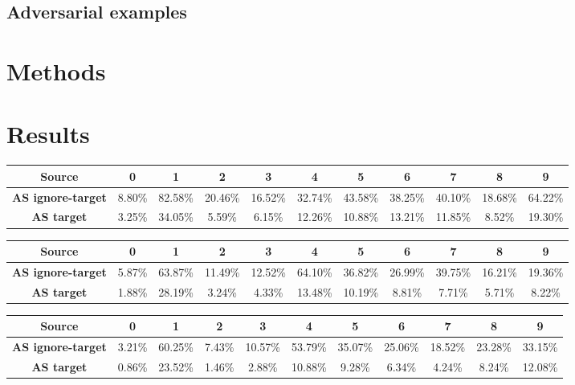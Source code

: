 \documentclass{report}
\begin{document}
\section{Adversarial examples}

\chapter{Methods}

\chapter{Results}

\begin{center}
{\tiny
  \begin{tabular}{|c|c|c|c|c|c|c|c|c|c|c|}
  \hline
  \textbf{Source} & \textbf{0} & \textbf{1} & \textbf{2} & \textbf{3} & \textbf{4} & \textbf{5} & \textbf{6} & \textbf{7} & \textbf{8} & \textbf{9}  \\ \hline
  \textbf{AS ignore-target} & 8.80\% & 82.58\% & 20.46\% & 16.52\% & 32.74\% & 43.58\% & 38.25\% & 40.10\% & 18.68\% & 64.22\% \\ \hline
  \textbf{AS target} & 3.25\% & 34.05\% & 5.59\% & 6.15\% & 12.26\% & 10.88\% & 13.21\% & 11.85\% & 8.52\% & 19.30\% \\ \hline
  \end{tabular}
}
\end{center}

\begin{center}
{\tiny
  \begin{tabular}{|c|c|c|c|c|c|c|c|c|c|c|}
  \hline
  \textbf{Source} & \textbf{0} & \textbf{1} & \textbf{2} & \textbf{3} & \textbf{4} & \textbf{5} & \textbf{6} & \textbf{7} & \textbf{8} & \textbf{9}  \\ \hline
  \textbf{AS ignore-target} & 5.87\% & 63.87\% & 11.49\% & 12.52\% & 64.10\% & 36.82\% & 26.99\% & 39.75\% & 16.21\% & 19.36\% \\ \hline
  \textbf{AS target} & 1.88\% & 28.19\% & 3.24\% & 4.33\% & 13.48\% & 10.19\% & 8.81\% & 7.71\% & 5.71\% & 8.22\% \\ \hline
  \end{tabular}
}
\end{center}

\begin{center}
{\tiny
  \begin{tabular}{|c|c|c|c|c|c|c|c|c|c|c|}
  \hline
  \textbf{Source} & \textbf{0} & \textbf{1} & \textbf{2} & \textbf{3} & \textbf{4} & \textbf{5} & \textbf{6} & \textbf{7} & \textbf{8} & \textbf{9}  \\ \hline
  \textbf{AS ignore-target} & 3.21\% & 60.25\% & 7.43\% & 10.57\% & 53.79\% & 35.07\% & 25.06\% & 18.52\% & 23.28\% & 33.15\% \\ \hline
  \textbf{AS target} & 0.86\% & 23.52\% & 1.46\% & 2.88\% & 10.88\% & 9.28\% & 6.34\% & 4.24\% & 8.24\% & 12.08\% \\ \hline
  \end{tabular}
}
\end{center}
\end{document}
